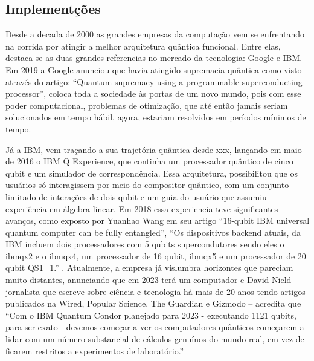 \subsection{Implementções}
Desde a decada de 2000 as grandes empresas da computação vem se enfrentando na corrida por atingir a melhor arquitetura quântica funcional. Entre elas, destaca-se as duas grandes referencias no mercado da tecnologia: Google e IBM. Em 2019 a Google anunciou que havia atingido supremacia quântica como visto através do artigo: ``Quantum supremacy using a programmable superconducting processor'', \cite{17} coloca toda a sociedade às portas de um novo mundo, pois com esse poder computacional, problemas de otimização, que até então jamais seriam solucionados em tempo hábil, agora, estariam resolvidos em períodos mínimos de tempo.

Já a IBM, vem traçando a sua trajetória quântica desde xxx, lançando em maio de 2016 o IBM Q Experience, que continha um processador quântico de cinco qubit e um simulador de correspondência. Essa arquitetura, possibilitou que os usuários só interagissem por meio do compositor quântico, com um conjunto limitado de interações de dois qubit e um guia do usuário que assumiu experiência em álgebra linear. Em 2018 essa experiencia teve significantes avanços, como exposto por Yuanhao Wang em seu artigo ``16-qubit IBM universal quantum computer can be fully entangled'', ``Os dispositivos backend atuais, da IBM incluem dois processadores com 5 qubits supercondutores sendo eles o ibmqx2 e o ibmqx4, um processador de 16 qubit, ibmqx5 e um processador de 20 qubit QS1\_1.'' \cite{18}. Atualmente, a empresa já vislumbra horizontes que pareciam muito distantes, anunciando que em 2023 terá um computador e David Nield – jornalista que escreve sobre ciência e tecnologia há mais de 20 anos tendo artigos publicados na Wired, Popular Science, The Guardian e Gizmodo – acredita que ``Com o IBM Quantum Condor planejado para 2023 - executando 1121 qubits, para ser exato - devemos começar a ver os computadores quânticos começarem a lidar com um número substancial de cálculos genuínos do mundo real, em vez de ficarem restritos a experimentos de laboratório.'' \cite{19}

